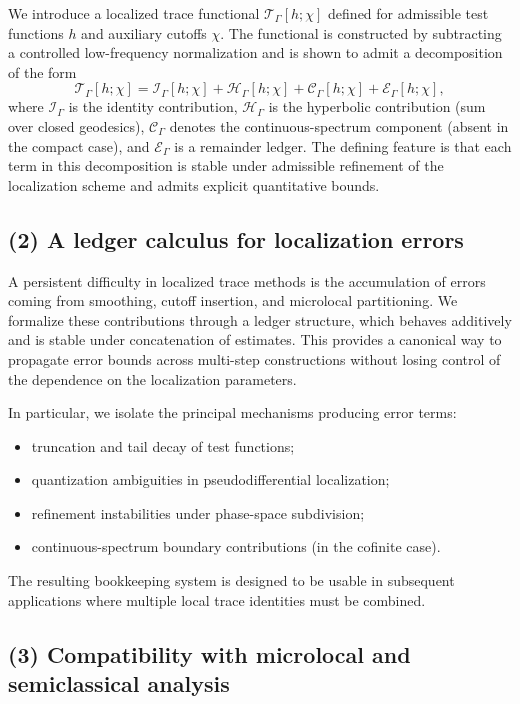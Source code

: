 We introduce a localized trace functional $\mathcal{T}_\Gamma[h;\chi]$ defined for admissible test functions $h$ and auxiliary cutoffs $\chi$.
The functional is constructed by subtracting a controlled low-frequency normalization and is shown to admit a decomposition of the form
\[
\mathcal{T}_\Gamma[h;\chi]
=
\mathcal{I}_\Gamma[h;\chi]
+
\mathcal{H}_\Gamma[h;\chi]
+
\mathcal{C}_\Gamma[h;\chi]
+
\mathcal{E}_\Gamma[h;\chi],
\]
where $\mathcal{I}_\Gamma$ is the identity contribution, $\mathcal{H}_\Gamma$ is the hyperbolic contribution (sum over closed geodesics), $\mathcal{C}_\Gamma$ denotes the continuous-spectrum component (absent in the compact case), and $\mathcal{E}_\Gamma$ is a remainder ledger.
The defining feature is that each term in this decomposition is stable under admissible refinement of the localization scheme and admits explicit quantitative bounds.

\subsection*{(2) A ledger calculus for localization errors}

A persistent difficulty in localized trace methods is the accumulation of errors coming from smoothing, cutoff insertion, and microlocal partitioning.
We formalize these contributions through a ledger structure, which behaves additively and is stable under concatenation of estimates.
This provides a canonical way to propagate error bounds across multi-step constructions without losing control of the dependence on the localization parameters.

In particular, we isolate the principal mechanisms producing error terms:
\begin{itemize}
  \item truncation and tail decay of test functions;
  \item quantization ambiguities in pseudodifferential localization;
  \item refinement instabilities under phase-space subdivision;
  \item continuous-spectrum boundary contributions (in the cofinite case).
\end{itemize}
The resulting bookkeeping system is designed to be usable in subsequent applications where multiple local trace identities must be combined.

\subsection*{(3) Compatibility with microlocal and semiclassical analysis}

